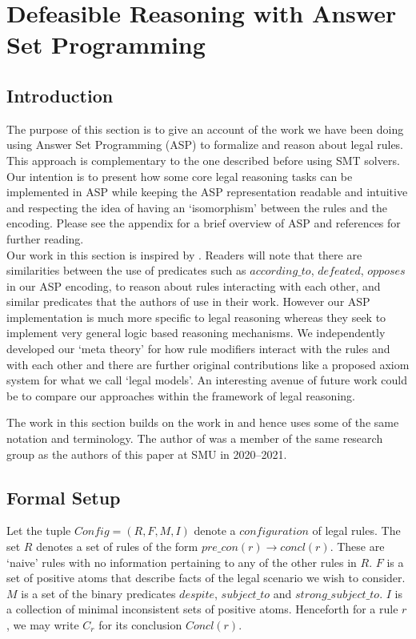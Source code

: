 \section{Defeasible Reasoning with Answer Set Programming}\label{sec:defeasible_asp}



\subsection{Introduction}
The purpose of this section is to give an account of the work we have been doing using Answer Set Programming (ASP) to formalize and reason about legal rules. This approach is complementary to the one described before using SMT solvers. Our intention is to present how some core legal reasoning tasks can be implemented in ASP while keeping the ASP representation readable and intuitive and respecting the idea of having an `isomorphism' between the rules and the encoding. Please see the appendix for a brief overview of ASP and references for further reading.\\

Our work in this section is inspired by \cite{DBLP:conf/iclp/WanGKFL09}. Readers will note that there are similarities between the use of predicates such as $according\_to$, $defeated$, $opposes$ in our ASP encoding, to reason about rules interacting with each other, and similar predicates that the authors of \cite{DBLP:conf/iclp/WanGKFL09} use in their work. However our ASP implementation is much more specific to legal reasoning whereas they seek to implement very general logic based reasoning mechanisms. We independently developed our `meta theory' for how rule modifiers interact with the rules and with each other and there are further original contributions like a proposed axiom system for what we call `legal models'. An interesting avenue of future work could be to compare our approaches within the framework of legal reasoning.

The work in this section builds on the work in \cite{morris21:_const_answer_set_progr_tool} and hence uses some of the same notation and terminology. The author of \cite{morris21:_const_answer_set_progr_tool} was a member of the same research group as the authors of this paper at SMU in 2020--2021.


\subsection{Formal Setup}
Let the tuple $Config = (R,F,M,I)$ denote a $configuration$ of legal rules. The set $R$ denotes a set of rules of the form $pre\_con(r)\rightarrow concl(r)$. These are `naive' rules with no information pertaining to any of the other rules in $R$. $F$ is a set of positive atoms that describe facts of the legal scenario we wish to consider. $M$ is a set of the binary predicates $despite$, $subject\_to$ and $strong\_subject\_to$. $I$ is a collection of minimal inconsistent sets of positive atoms. Henceforth for a rule $r$, we may write $C_{r}$ for its conclusion $Concl(r)$.


